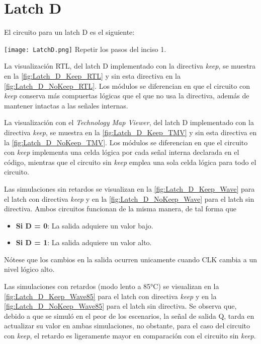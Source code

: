 \section{Latch D \label{sec:s2}}

\begin{center}
	\begin{minipage}{12cm}
		\begin{tcolorbox}[title=Actividad 2]
			El circuito para un latch D es el siguiente:\enter
			
				\texttt{[image: LatchD.png]}
			Repetir los pasos del inciso 1.
		\end{tcolorbox}	
	\end{minipage}
\end{center}

La visualización RTL, del latch D implementado con la directiva \textit{keep}, se muestra en la \autoref{fig:Latch_D_Keep_RTL} y sin esta directiva en la \autoref{fig:Latch_D_NoKeep_RTL}. Los módulos se diferencian en que el circuito con \textit{keep} conserva más compuertas lógicas que el que no usa la directiva, además de mantener intactas a las señales internas.

La visualización con el \textit{Technology Map Viewer}, del latch D implementado con la directiva \textit{keep}, se muestra en la \autoref{fig:Latch_D_Keep_TMV} y sin esta directiva en la \autoref{fig:Latch_D_NoKeep_TMV}. Los módulos se diferencian en que el circuito con \textit{keep} implementa una celda lógica por cada señal interna declarada en el código, mientras que el circuito sin \textit{keep} emplea una sola celda lógica para todo el circuito.

Las simulaciones sin retardos se visualizan en la \autoref{fig:Latch_D_Keep_Wave} para el latch con directiva \textit{keep} y en la \autoref{fig:Latch_D_NoKeep_Wave} para el latch sin directiva. Ambos circuitos funcionan de la misma manera, de tal forma que 

\begin{itemize}
	\item \textbf{Si D = 0}: La salida adquiere un valor bajo.
	\item \textbf{Si D = 1}: La salida adquiere un valor alto.
\end{itemize}

Nótese que los cambios en la salida ocurren unicamente cuando CLK cambia a un nivel lógico alto.

Las simulaciones con retardos (modo lento a 85°C) se visualizan en la \autoref{fig:Latch_D_Keep_Wave85} para el latch con directiva \textit{keep} y en la \autoref{fig:Latch_D_NoKeep_Wave85} para el latch sin directiva. Se observa que, debido a que se simuló en el peor de los escenarios, la señal de salida Q, tarda en actualizar su valor en ambas simulaciones, no obstante, para el caso del circuito con \textit{keep}, el retardo es ligeramente mayor en comparación con el circuito sin \textit{keep}.

